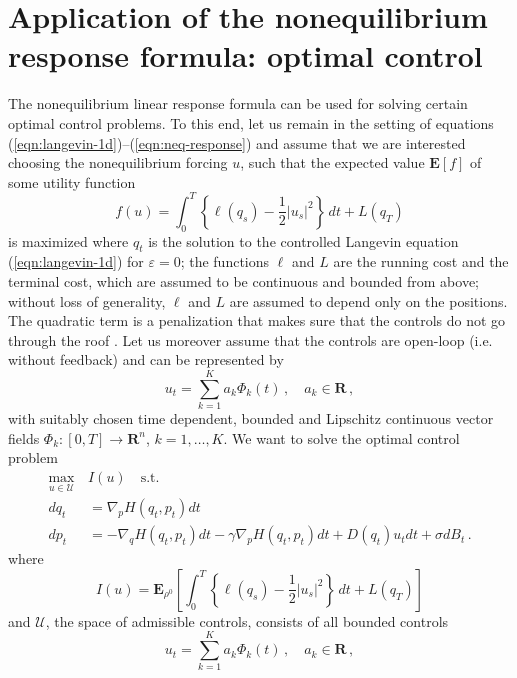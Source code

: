 \documentclass[]{tMPH2e}
\newcommand{\R}{{\mathbf R}}
\newcommand{\eps}{\varepsilon}
\newcommand{\cU}{\mathcal U}
\newcommand{\bE}{{\mathbf E}}
\begin{document}
\section{Application of the nonequilibrium response formula: optimal control}

The nonequilibrium linear response formula can be used for solving certain optimal control problems. To this end, let us remain in the setting of equations (\ref{eqn:langevin-1d})--(\ref{eqn:neq-response}) and assume that we are interested choosing the nonequilibrium forcing $u$, such that the expected value $\bE[f]$ of some utility function 
\[
f(u) = \int_{0}^{T}\left\{\ell (q_{s}) - \frac{1}{2}|u_{s}|^{2}\right\}\,dt + L(q_{T}) 
\]
is maximized where $q_{t}$ is the solution to the controlled Langevin equation (\ref{eqn:langevin-1d}) for $\eps=0$; the functions $\ell$ and $L$ are the running cost and the terminal cost, which are assumed to be continuous and bounded from above; without loss of generality, $\ell$ and $L$ are assumed to depend only on the positions. The quadratic term is a penalization that makes sure that the controls do not go through the roof \cite{schuette2012,hartmann2012}. Let us moreover assume that the controls are open-loop (i.e. without feedback) and can be represented by 
\[
u_{t} = \sum_{k=1}^K a_k \Phi_k(t)\,,\quad a_{k}\in \R\,,
\]
with suitably chosen time dependent, bounded and Lipschitz continuous vector fields $\Phi_k\colon[0,T]\to\R^{n}$, $k=1,\ldots,K$. %
We want to solve the optimal control problem
\begin{equation}\label{ocp1}
\begin{aligned}
 \max_{u\in\cU} \,& I(u)\quad \textrm{s.t.}\\
dq_t & =  \nabla_p H(q_t,p_t)dt\\
dp_t & =  -\nabla_q H(q_t,p_t)dt - \gamma \nabla_p H(q_t,p_t)dt + D(q_t)u_{t} dt+\sigma dB_t\,.
\end{aligned}
\end{equation}
where 
\begin{equation}\label{ocp2}
I(u) = \bE_{\rho^0}\left[\int_{0}^{T}\left\{\ell (q_{s}) - \frac{1}{2}|u_{s}|^{2}\right\}\,dt + L(q_{T}) \right]
\end{equation}
and $\cU$, the space of admissible controls, consists of all bounded controls 
\begin{equation}\label{admissible}
u_{t} = \sum_{k=1}^K a_k \Phi_k(t)\,,\quad a_{k}\in \R\,,
\end{equation}
\end{document}
